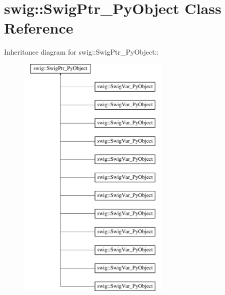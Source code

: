 \hypertarget{classswig_1_1SwigPtr__PyObject}{
\section{swig::SwigPtr\_\-PyObject Class Reference}
\label{d2/d50/classswig_1_1SwigPtr__PyObject}
}
Inheritance diagram for swig::SwigPtr\_\-PyObject::\begin{figure}[H]
\begin{center}
\leavevmode
\includegraphics[height=12cm]{d2/d50/classswig_1_1SwigPtr__PyObject}
\end{center}
\end{figure}
